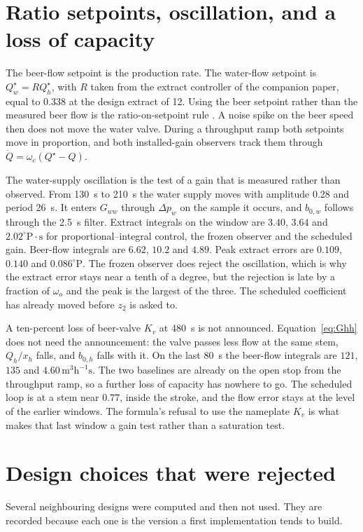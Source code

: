 \documentclass[conference,a4paper]{IEEEtran}
\newcommand{\degP}{^{\circ}\mathrm{P}}
\begin{document}
\section{Ratio setpoints, oscillation, and a loss of capacity}
The beer-flow setpoint is the production rate. The water-flow setpoint is $Q_w^\star=R Q_h^\star$, with $R$ taken from the extract controller of the companion paper, equal to $0.338$ at the design extract of \SI{12}{\plato}. Using the beer setpoint rather than the measured beer flow is the ratio-on-setpoint rule \cite{shinskey1996process}. A noise spike on the beer speed then does not move the water valve. During a throughput ramp both setpoints move in proportion, and both installed-gain observers track them through $\dot{Q}=\omega_c(Q^\star-Q)$.

The water-supply oscillation is the test of a gain that is measured rather than observed. From \SI{130}{s} to \SI{210}{s} the water supply moves with amplitude \SI{0.28}{\barg} and period \SI{26}{s}. It enters $G_{ww}$ through $\Delta p_w$ on the sample it occurs, and $b_{0,w}$ follows through the \SI{2.5}{s} filter. Extract integrals on the window are $3.40$, $3.64$ and $2.02\degP\cdot\mathrm{s}$ for proportional--integral control, the frozen observer and the scheduled gain. Beer-flow integrals are $6.62$, $10.2$ and $4.89$. Peak extract errors are $0.109$, $0.140$ and $0.086\degP$. The frozen observer does reject the oscillation, which is why the extract error stays near a tenth of a degree, but the rejection is late by a fraction of $\omega_o$ and the peak is the largest of the three. The scheduled coefficient has already moved before $z_2$ is asked to.

A ten-percent loss of beer-valve $K_v$ at \SI{480}{s} is not announced. Equation~\eqref{eq:Ghh} does not need the announcement: the valve passes less flow at the same stem, $Q_h/x_h$ falls, and $b_{0,h}$ falls with it. On the last \SI{80}{s} the beer-flow integrals are $121$, $135$ and $4.60\,\mathrm{m}^3\mathrm{h}^{-1}\mathrm{s}$. The two baselines are already on the open stop from the throughput ramp, so a further loss of capacity has nowhere to go. The scheduled loop is at a stem near $0.77$, inside the stroke, and the flow error stays at the level of the earlier windows. The formula's refusal to use the nameplate $K_v$ is what makes that last window a gain test rather than a saturation test.

\section{Design choices that were rejected}
Several neighbouring designs were computed and then not used. They are recorded because each one is the version a first implementation tends to build.
\end{document}
